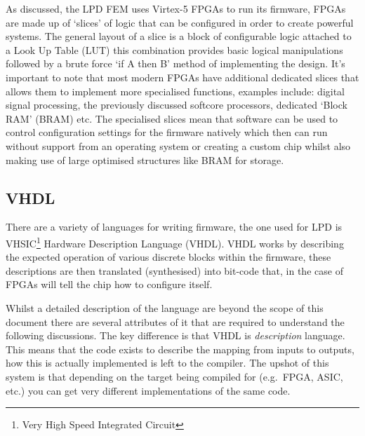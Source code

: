 As discussed, the LPD FEM uses Virtex-5 FPGAs to run its firmware, FPGAs are made up of `slices' of logic that can be configured in order to create powerful systems. The general layout of a slice is a block of configurable logic attached to a Look Up Table (LUT) this combination provides basic logical manipulations followed by a brute force `if A then B' method of implementing the design. It's important to note that most modern FPGAs have additional dedicated slices that allows them to implement more specialised functions, examples include: digital signal processing, the previously discussed softcore processors, dedicated `Block RAM' (BRAM) etc. The specialised slices mean that software can be used to control configuration settings for the firmware natively which then can run without support from an operating system or creating a custom chip whilst also making use of large optimised structures like BRAM for storage.

\subsection{VHDL} %
\label{sub:vhdl}
There are a variety of languages for writing firmware, the one used for LPD is VHSIC\footnote{Very High Speed Integrated Circuit} Hardware Description Language (VHDL). VHDL works by describing the expected operation of various discrete blocks within the firmware, these descriptions are then translated (synthesised) into bit-code that, in the case of FPGAs will tell the chip how to configure itself.

Whilst a detailed description of the language are beyond the scope of this document there are several attributes of it that are required to understand the following discussions. The key difference is that VHDL is \emph{description} language. This means that the code exists to describe the mapping from inputs to outputs, how this is actually implemented is left to the compiler. The upshot of this system is that depending on the target being compiled for (e.g.\ FPGA, ASIC, etc.) you can get very different implementations of the same code.


